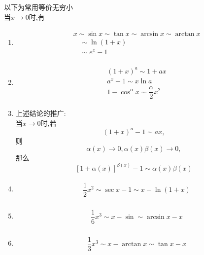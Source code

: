 \documentclass[9pt a4paper, oneside, UTF8]{ctexbook}
\begin{document}
\begin{sloppypar}
    以下为常用等价无穷小
    \\当$x \to 0$时,有
    \begin{enumerate}
        \item     \begin{align*} \boxed{\begin{aligned}& x \sim \sin x \sim \tan x \sim \arcsin x \sim \arctan x \nonumber \\& \quad  \sim \ln (1+x)  \nonumber                                  \\& \quad \sim e^x -1 \nonumber\end{aligned} }\end{align*}
        \item     \begin{align*} \boxed{\begin{aligned}& (1+x)^a \sim  1+ax   \\& a^x - 1 \sim x \ln a \\& 1- \cos^{\alpha} x \sim \dfrac{\alpha}{2}x^2\end{aligned}}\end{align*}
        \item  上述结论的推广:\\
        当$x \to 0$时,若$$(1+x)^a -1 \sim ax,$$则$$\alpha (x) \to 0,\alpha(x)\beta(x) \to 0,$$那么$$[1+\alpha(x)]^{\beta(x)} -1 \sim \alpha(x) \beta(x)$$
        \item     \begin{align*} \boxed
            {
                \begin{aligned}
                     & \dfrac{1}{2} x^2  \sim \sec x -1 \sim x- \ln(1+x)
                \end{aligned}
            }
        \end{align*}
        \item     \begin{align*} \boxed
            {
                \begin{aligned}
                     & \dfrac{1}{6} x^3 \sim x-\sin \sim \arcsin x -x
                \end{aligned}
            }
        \end{align*}
        \item     \begin{align*} \boxed
            {
                \begin{aligned}
                     & \dfrac{1}{3} x^3 \sim x-\arctan x \sim \tan x-x
                \end{aligned}
            }

\end{align*}
\end{enumerate}
\end{sloppypar}
\end{document}
